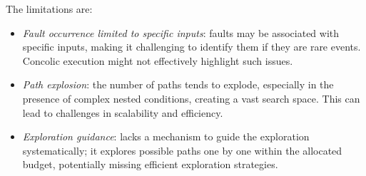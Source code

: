 The limitations are: 
\begin{itemize}
    \item \textit{Fault occurrence limited to specific inputs}: faults may be associated with specific inputs, making it challenging to identify them if they are rare events. 
        Concolic execution might not effectively highlight such issues.
    \item \textit{Path explosion}: the number of paths tends to explode, especially in the presence of complex nested conditions, creating a vast search space. 
        This can lead to challenges in scalability and efficiency.
    \item \textit{Exploration guidance}: lacks a mechanism to guide the exploration systematically; it explores possible paths one by one within the allocated budget, potentially missing efficient exploration strategies.
\end{itemize}

